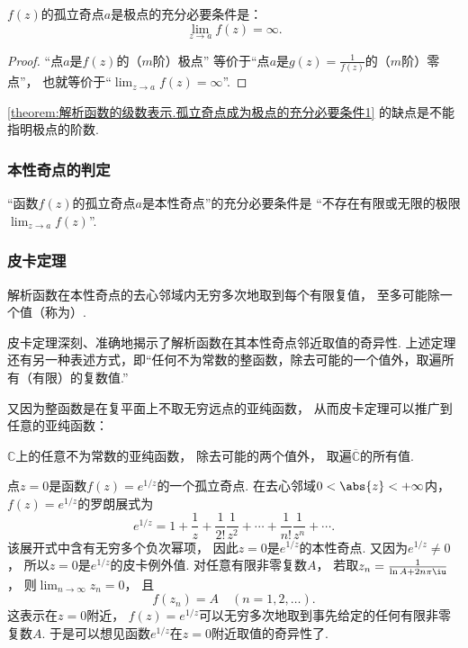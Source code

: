 \begin{corollary}\label{theorem:解析函数的级数表示.孤立奇点成为极点的充分必要条件1}
\(f(z)\)的孤立奇点\(a\)是极点的充分必要条件是：\begin{equation*}
	\lim_{z \to a} f(z) = \infty.
\end{equation*}
\begin{proof}
“点\(a\)是\(f(z)\)的（\(m\)阶）极点”
等价于“点\(a\)是\(g(z) = \frac{1}{f(z)}\)的（\(m\)阶）零点”，
也就等价于“\(\lim_{z \to a} f(z) = \infty\)”.
\end{proof}
\end{corollary}
\cref{theorem:解析函数的级数表示.孤立奇点成为极点的充分必要条件1} 的缺点是不能指明极点的阶数.

\subsubsection{本性奇点的判定}
\begin{theorem}
“函数\(f(z)\)的孤立奇点\(a\)是本性奇点”的充分必要条件是
“不存在有限或无限的极限\(\lim_{z \to a} f(z)\)”.
\end{theorem}

\subsubsection{皮卡定理}
\begin{theorem}[皮卡定理]
解析函数在本性奇点的去心邻域内无穷多次地取到每个有限复值，
至多可能除一个值（称为）.
\end{theorem}
皮卡定理深刻、准确地揭示了解析函数在其本性奇点邻近取值的奇异性.
上述定理还有另一种表述方式，即“任何不为常数的整函数，除去可能的一个值外，取遍所有（有限）的复数值.”

又因为整函数是在复平面上不取无穷远点的亚纯函数，
从而皮卡定理可以推广到任意的亚纯函数：
\begin{theorem}
\(\mathbb{C}\)上的任意不为常数的亚纯函数，
除去可能的两个值外，
取遍\(\overline{\mathbb{C}}\)的所有值.
\end{theorem}

\begin{example}
点\(z=0\)是函数\(f(z) = e^{1/z}\)的一个孤立奇点.
在去心邻域\(0<\abs{z}<+\infty\)内，
\(f(z) = e^{1/z}\)的罗朗展式为\begin{equation*}
	e^{1/z}
	= 1 + \frac{1}{z}
	+ \frac{1}{2!} \frac{1}{z^2}
	+ \dotsb
	+ \frac{1}{n!} \frac{1}{z^n}
	+ \dotsb.
\end{equation*}
该展开式中含有无穷多个负次幂项，
因此\(z=0\)是\(e^{1/z}\)的本性奇点.
又因为\(e^{1/z}\neq0\)，
所以\(z=0\)是\(e^{1/z}\)的皮卡例外值.
对任意有限非零复数\(A\)，
若取\(z_n = \frac{1}{\ln A + 2n\pi\iu}\)，
则\(\lim_{n\to\infty} z_n = 0\)，
且\begin{equation*}
	f(z_n) = A
	\quad(n=1,2,\dotsc).
\end{equation*}
这表示在\(z=0\)附近，
\(f(z) = e^{1/z}\)可以无穷多次地取到事先给定的任何有限非零复数\(A\).
于是可以想见函数\(e^{1/z}\)在\(z=0\)附近取值的奇异性了.
\end{example}

